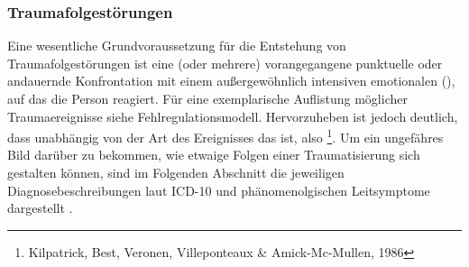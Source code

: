      


\subsubsection{Traumafolgestörungen}


{Eine wesentliche Grundvoraussetzung für die Entstehung von
Traumafolgestörungen ist eine (oder mehrere) vorangegangene
punktuelle oder andauernde Konfrontation mit einem
außergewöhnlich intensiven emotionalen
 (), auf das die Person  reagiert. 
Für eine
exemplarische Auflistung möglicher Traumaereignisse siehe
Fehlregulationsmodell. 
Hervorzuheben ist jedoch deutlich,
dass  unabhängig von der Art des Ereignisses das
 ist,
also \footnote{Kilpatrick, Best,
Veronen, Villeponteaux \& Amick-Mc-Mullen, 1986}. Um ein
ungefähres Bild darüber zu bekommen, wie etwaige Folgen einer
Traumatisierung sich gestalten können, sind im Folgenden
Abschnitt die jeweiligen Diagnosebeschreibungen laut ICD-10
und phänomenolgischen Leitsymptome dargestellt
\cite{ICD10-De-2011}.}
{}
{}
{}
{}





